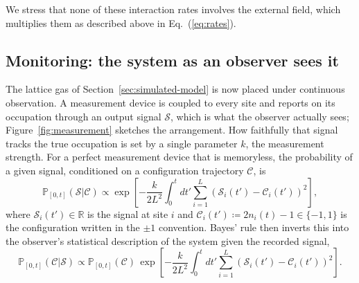 \documentclass[11pt]{article}
\begin{document}
We stress that none of these interaction rates involves the external field, which multiplies them as described above in Eq.~(\ref{eq:rates}).


\subsection{Monitoring: the system as an observer sees it}
\label{sec:monitoring}

The lattice gas of Section~\ref{sec:simulated-model} is now placed under continuous observation. A measurement device is coupled to every site and reports on its occupation through an output signal $\mathcal{S}$, which is what the observer actually sees; Figure~\ref{fig:measurement} sketches the arrangement. How faithfully that signal tracks the true occupation is set by a single parameter $k$, the measurement strength. For a perfect measurement device that is memoryless, the probability of a given signal, conditioned on a configuration trajectory $\mathcal{C}$, is
\begin{equation}\label{eq:S|C}
    \mathbb{P}_{\left[0,t\right]}\left(\mathcal{S}|\mathcal{C}\right) \propto \exp\left[-\frac{k}{2L^2}\int_0^t dt' \sum_{i=1}^L \left(\mathcal{S}_i(t') -\mathcal{C}_i(t')\right)^2\right],
\end{equation}
where $\mathcal{S}_i(t')\in \mathbb{R}$ is the signal at site $i$ and $\mathcal{C}_i(t') \coloneqq 2 n_i(t)-1 \in\{-1,1\}$ is the configuration written in the $\pm 1$ convention. Bayes' rule then inverts this into the observer's statistical description of the system given the recorded signal,
\begin{equation}\label{eq:C|S}
    \mathbb{P}_{\left[0,t\right]}\left(\mathcal{C}|\mathcal{S}\right) \propto \mathbb{P}_{\left[0,t\right]}\left(\mathcal{C}\right)\,\exp\left[-\frac{k}{2L^2}\int_0^t dt' \sum_{i=1}^L \left(\mathcal{S}_i(t') -\mathcal{C}_i(t')\right)^2\right] .
\end{equation}
\end{document}
